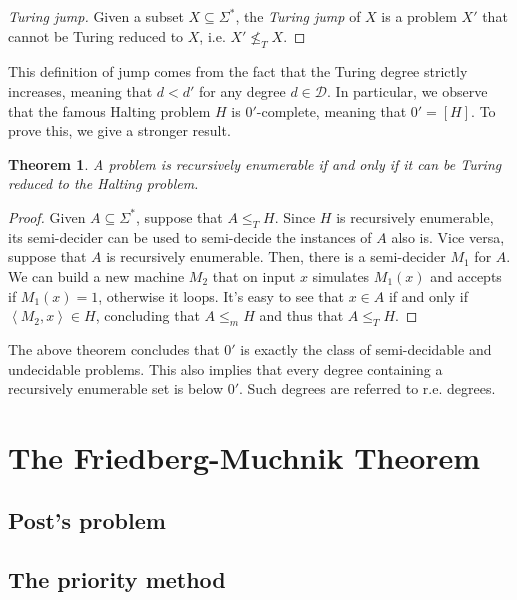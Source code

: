 \documentclass[12pt,a4paper]{article}
\newtheorem{theorem}{Theorem}
\theoremstyle{definition}
\newcommand{\abk}[1]{\left\langle#1\right\rangle}
\begin{document}
    \begin{proof}[Turing jump]
        Given a subset $X \subseteq \Sigma^*$, the \textit{Turing jump} of $X$ is a problem $X'$ that cannot be Turing reduced to $X$, i.e. $X' \not\leq_T X$.
    \end{proof}

    This definition of jump comes from the fact that the Turing degree strictly increases, meaning that $d < d'$ for any degree $d \in \mathcal{D}$. In particular, we observe that the famous Halting problem $H$ is $0'$-complete, meaning that $0' = [H]$. To prove this, we give a stronger result.

    \begin{theorem}
        A problem is recursively enumerable if and only if it can be Turing reduced to the Halting problem.
    \end{theorem}

    \begin{proof}
        Given $A \subseteq \Sigma^*$, suppose that $A \leq_T H$. Since $H$ is recursively enumerable, its semi-decider can be used to semi-decide the instances of $A$ also is. Vice versa, suppose that $A$ is recursively enumerable. Then, there is a semi-decider $M_1$ for $A$. We can build a new machine $M_2$ that on input $x$ simulates $M_1(x)$ and accepts if $M_1(x) = 1$, otherwise it loops. It's easy to see that $x \in A$ if and only if $\abk{M_2, x} \in H$, concluding that $A \leq_m H$ and thus that $A \leq_T H$.
    \end{proof}

    The above theorem concludes that $0'$ is exactly the class of semi-decidable and undecidable problems. This also implies that every degree containing a recursively enumerable set is below $0'$. Such degrees are referred to r.e. degrees.

    \section{The Friedberg-Muchnik Theorem}

    \subsection{Post's problem}

    \subsection{The priority method}
\end{document}
